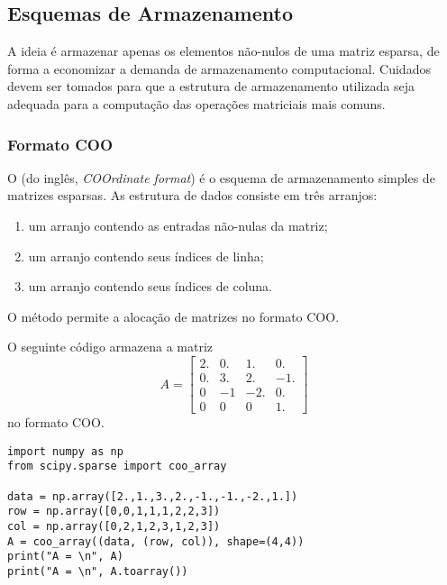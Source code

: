 \subsection{Esquemas de Armazenamento}

A ideia é armazenar apenas os elementos não-nulos de uma matriz esparsa, de forma a economizar a demanda de armazenamento computacional. Cuidados devem ser tomados para que a estrutura de armazenamento utilizada seja adequada para a computação das operações matriciais mais comuns.

\subsubsection{Formato COO}

O  (do inglês, \textit{COOrdinate format}) é o esquema de armazenamento simples de matrizes esparsas. As estrutura de dados consiste em três arranjos:
\begin{enumerate}[1.]
  \item um arranjo contendo as entradas não-nulas da matriz; 
  \item um arranjo contendo seus índices de linha; 
  \item um arranjo contendo seus índices de coluna.
\end{enumerate}
O método {\PYTHONscipyDOTsparseDOTcooArray} permite a alocação de matrizes no formato COO. 

\begin{ex}\label{ex:coo}
  O seguinte código armazena a matriz
  \begin{equation}
    A =
    \begin{bmatrix}
      2. & 0. & 1.  & 0.\\
      0. & 3. & 2.  & -1.\\
      0  & -1 & -2. & 0.\\
      0  & 0  & 0   & 1.
    \end{bmatrix}
  \end{equation}
  no formato COO.

\begin{lstlisting}
import numpy as np
from scipy.sparse import coo_array

data = np.array([2.,1.,3.,2.,-1.,-1.,-2.,1.])
row = np.array([0,0,1,1,1,2,2,3])
col = np.array([0,2,1,2,3,1,2,3])
A = coo_array((data, (row, col)), shape=(4,4))
print("A = \n", A)
print("A = \n", A.toarray())
\end{lstlisting}

\end{ex}

